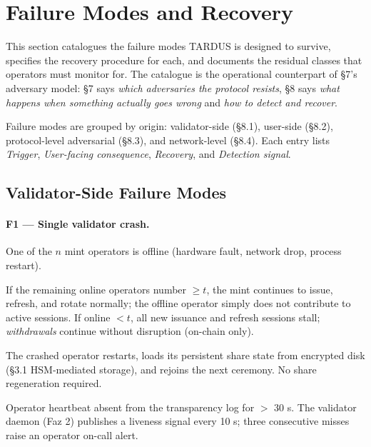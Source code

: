 \section{Failure Modes and Recovery}
\label{sec:failure-modes}

This section catalogues the failure modes TARDUS is designed to survive,
specifies the recovery procedure for each, and documents the residual
classes that operators must monitor for. The catalogue is the operational
counterpart of \S7's adversary model: \S7 says \emph{which adversaries
the protocol resists}, \S8 says \emph{what happens when something actually
goes wrong} and \emph{how to detect and recover}.

Failure modes are grouped by origin: validator-side (\S8.1),
user-side (\S8.2), protocol-level adversarial (\S8.3), and
network-level (\S8.4). Each entry lists \textit{Trigger},
\textit{User-facing consequence}, \textit{Recovery}, and
\textit{Detection signal}.

\subsection{Validator-Side Failure Modes}
\label{sec:failure-validator}

\paragraph{F1 --- Single validator crash.}
\begin{description}[leftmargin=2em,style=nextline,itemsep=0pt]
  \item[Trigger] One of the $n$ mint operators is offline (hardware
    fault, network drop, process restart).
  \item[Consequence] If the remaining online operators number $\geq t$,
    the mint continues to issue, refresh, and rotate normally; the
    offline operator simply does not contribute to active sessions.
    If online $< t$, all new issuance and refresh sessions stall;
    \emph{withdrawals} continue without disruption (on-chain only).
  \item[Recovery] The crashed operator restarts, loads its persistent
    share state from encrypted disk (\S3.1 HSM-mediated storage),
    and rejoins the next ceremony. No share regeneration required.
  \item[Detection] Operator heartbeat absent from the transparency log
    for $>$ 30 s. The validator daemon (Faz 2) publishes a liveness
    signal every 10 s; three consecutive misses raise an operator
    on-call alert.
\end{description}

